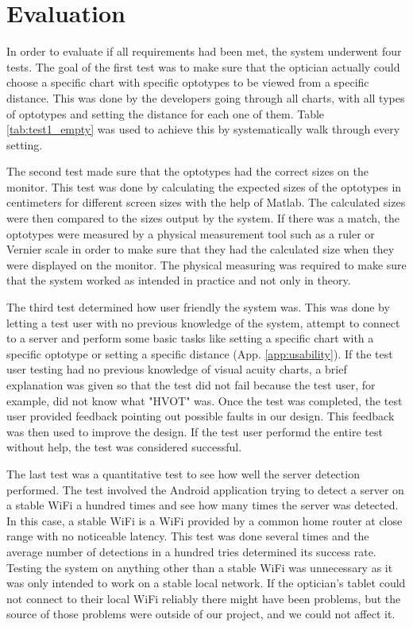 \documentclass[12pt,a4paper,notitlepage]{report}
\begin{document}
\section{Evaluation \label{sec:evaluation}}
In order to evaluate if all requirements had been met, the system underwent four tests. The goal of the first test was to make sure that the optician actually could choose a specific chart with specific optotypes to be viewed from a specific distance. This was done by the developers going through all charts, with all types of optotypes and setting the distance for each one of them. Table \ref{tab:test1_empty} was used to achieve this by systematically walk through every setting.

The second test made sure that the optotypes had the correct sizes on the monitor. This test was done by calculating the expected sizes of the optotypes in centimeters for different screen sizes with the help of Matlab. The calculated sizes were then compared to the sizes output by the system. If there was a match, the optotypes were measured by a physical measurement tool such as a ruler or Vernier scale in order to make sure that they had the calculated size when they were displayed on the monitor. The physical measuring was required to make sure that the system worked as intended in practice and not only in theory.

The third test determined how user friendly the system was. This was done by letting a test user with no previous knowledge of the system, attempt to connect to a server and perform some basic tasks like setting a specific chart with a specific optotype or setting a specific distance (App. \ref{app:usability}). If the test user testing had no previous knowledge of visual acuity charts, a brief explanation was given so that the test did not fail because the test user, for example, did not know what "HVOT" was. Once the test was completed, the test user provided feedback pointing out possible faults in our design. This feedback was then used to improve the design. If the test user performd the entire test without help, the test was considered successful.

The last test was a quantitative test to see how well the server detection performed. The test involved the Android application trying to detect a server on a stable WiFi a hundred times and see how many times the server was detected. In this case, a stable WiFi is a WiFi provided by a common home router at close range with no noticeable latency. This test was done several times and the average number of detections in a hundred tries determined its success rate. Testing the system on anything other than a stable WiFi was unnecessary as it was only intended to work on a stable local network. If the optician's tablet could not connect to their local WiFi reliably there might have been problems, but the source of those problems were outside of our project, and we could not affect it.
\end{document}
